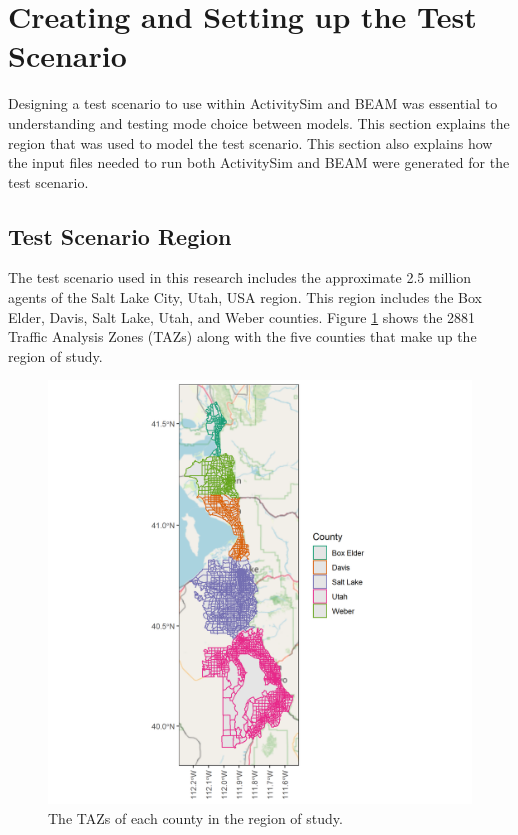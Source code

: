 \documentclass[12pt, oneside, openright]{byuthesis}
\begin{document}
\hypertarget{mscen}{%
\section{Creating and Setting up the Test Scenario}\label{mscen}}

Designing a test scenario to use within ActivitySim and BEAM was essential to understanding and testing mode choice between models. This section explains the region that was used to model the test scenario. This section also explains how the input files needed to run both ActivitySim and BEAM were generated for the test scenario.

\hypertarget{test-scenario-region}{%
\subsection{Test Scenario Region}\label{test-scenario-region}}

The test scenario used in this research includes the approximate 2.5 million agents of the Salt Lake City, Utah, USA region. This region includes the Box Elder, Davis, Salt Lake, Utah, and Weber counties. Figure \ref{fig:figregion} shows the 2881 Traffic Analysis Zones (TAZs) along with the five counties that make up the region of study.

\begin{figure}

{\centering \includegraphics[width=480px]{pics/taz} 

}

\caption{The TAZs of each county in the region of study.}\label{fig:figregion}
\end{figure}
\end{document}
